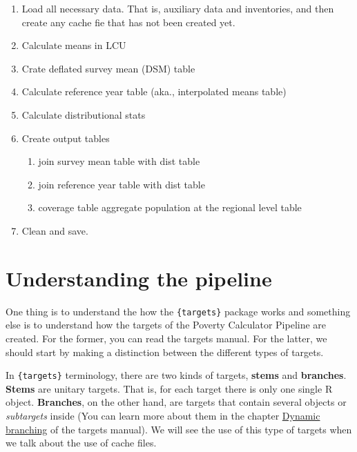 \documentclass[
]{book}
\begin{document}
\begin{enumerate}
\def\labelenumi{\arabic{enumi}.}
\item
  Load all necessary data. That is, auxiliary data and inventories, and then
  create any cache fie that has not been created yet.
\item
  Calculate means in LCU
\item
  Crate deflated survey mean (DSM) table
\item
  Calculate reference year table (aka., interpolated means table)
\item
  Calculate distributional stats
\item
  Create output tables

  \begin{enumerate}
  \def\labelenumii{\arabic{enumii}.}
  \item
    join survey mean table with dist table
  \item
    join reference year table with dist table
  \item
    coverage table aggregate population at the regional level table
  \end{enumerate}
\item
  Clean and save.
\end{enumerate}

\hypertarget{understanding-the-pipeline}{%
\section{Understanding the pipeline}\label{understanding-the-pipeline}}

One thing is to understand the how the \texttt{\{targets\}} package works and something
else is to understand how the targets of the Poverty Calculator Pipeline are
created. For the former, you can read the targets manual. For the latter, we
should start by making a distinction between the different types of targets.

In \texttt{\{targets\}} terminology, there are two kinds of targets, \textbf{stems} and
\textbf{branches}. \textbf{Stems} are unitary targets. That is, for each target there is
only one single R object. \textbf{Branches}, on the other hand, are targets that
contain several objects or \emph{subtargets} inside (You can learn more about them in
the chapter \href{https://books.ropensci.org/targets/dynamic.html\#dynamic}{Dynamic
branching} of the
targets manual). We will see the use of this type of targets when we talk about
the use of cache files.
\end{document}

